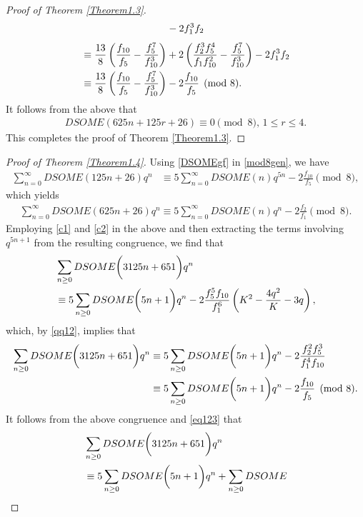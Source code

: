 \documentclass[12pt]{amsart}
\theoremstyle{definition}
\numberwithin{equation}{section}
\begin{document}
\begin{proof}[Proof of Theorem \ref{Theorem1.3}]
\begin{align}
         &\quad-2f_1^3f_2
         \notag\end{align}\begin{align}
        &\equiv\frac{13}{8}\left(\frac{f_{10}}{f_5}-\frac{f_5^7}{f_{10}^3}\right)+2\left(\frac{f_2^3f_5^4}{f_1f_{10}^2}-\frac{f_5^7}{f_{10}^3}\right)-2f_1^3f_2\notag\\
            &\equiv\frac{13}{8}\left(\frac{f_{10}}{f_5}-\frac{f_5^7}{f_{10}^3}\right)-2\frac{f_{10}}{f_5}\pmod{8}.\notag
\end{align}
It follows from the above that
\begin{align*}    DSOME(625n+125r+26)\equiv0\pmod{8},\, 1\leq r\leq4.
\end{align*}
This completes the proof of Theorem \ref{Theorem1.3}.
  \end{proof}
 \begin{proof}[Proof of Theorem \ref{Theorem1.4}] Using \eqref{DSOMEgf} in \eqref{mod8gen}, we have
 \begin{align}     
\sum_{n=0}^{\infty}DSOME(125n+26)q^n&\equiv  5\sum_{n=0}^{\infty}DSOME(n)q^{5n}-2\frac{f_{10}}{f_5}\pmod{8},\label{eq123}
\end{align}
which yields
     \begin{align*}
        \sum_{n=0}^{\infty} DSOME(625n+26)q^n\equiv  5\sum_{n=0}^{\infty} DSOME(n)q^n-2\frac{f_2}{f_1}\pmod{8}.
        \end{align*}
   Employing \eqref{c1} and \eqref{c2} in the above and then extracting the terms involving $q^{5n+1}$ from the resulting congruence, we find that
\begin{align*}
&\sum_{n\geq0}DSOME\bigg(3125n+651\bigg)q^n\notag\\
&\equiv 5\sum_{n\geq0}DSOME\bigg(5n+1\bigg)q^n-2\frac{f_5^5f_{10}}{f_1^6}\left(K^2-\dfrac{4q^2}{K}-3q\right),
        \end{align*}
    which, by \eqref{qq12}, implies that
\begin{align*}
\sum_{n\geq0}DSOME\bigg(3125n+651\bigg)q^n&\equiv 5\sum_{n\geq0}DSOME\bigg(5n+1\bigg)q^n-2\frac{f_2^2f_5^3}{f_1^4f_{10}}\notag\\
&\equiv 5\sum_{n\geq0}DSOME\bigg(5n+1\bigg)q^n-2\frac{f_{10}}{f_5}\pmod{8}.
        \end{align*}
It follows from the above congruence and \eqref{eq123}  that
          \begin{align}\label{y1}       
        &\sum_{n\geq0}DSOME\bigg(3125n+651\bigg)q^n\\
&\equiv 5\sum_{n\geq0}DSOME\bigg(5n+1\bigg)q^n+\sum_{n\geq0}DSOME\notag

\end{align}
\end{proof}
\end{document}
